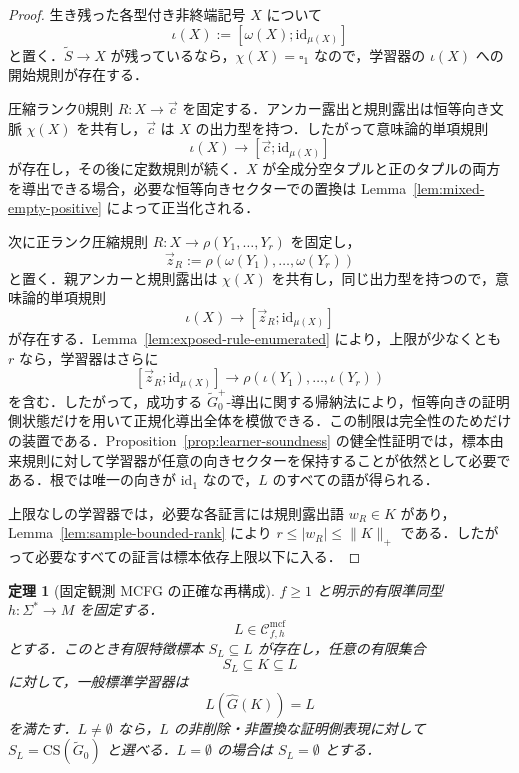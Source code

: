 \documentclass[11pt,a4paper]{ltjsarticle}
\numberwithin{equation}{section}
\theoremstyle{plain}
\newtheorem{theorem}{定理}[section]
\theoremstyle{definition}
\theoremstyle{remark}
\newcommand{\CS}{\mathrm{CS}}
\newcommand{\Cmcf}[2]{\mathcal{C}^{\mathrm{mcf}}_{#1,#2}}
\newcommand{\tuple}[1]{\vec{#1}}
\newcommand{\blank}{\square}
\begin{document}
\begin{proof}
生き残った各型付き非終端記号 \(X\) について
\[
  \iota(X):=[\omega(X);\mathrm{id}_{\mu(X)}]
\]
と置く．\(\widetilde S\to X\) が残っているなら，\(\chi(X)=\blank_1\) なので，学習器の \(\iota(X)\) への開始規則が存在する．

圧縮ランク0規則 \(R:X\to\tuple c\) を固定する．アンカー露出と規則露出は恒等向き文脈 \(\chi(X)\) を共有し，\(\tuple c\) は \(X\) の出力型を持つ．したがって意味論的単項規則
\[
  \iota(X)\to[\tuple c;\mathrm{id}_{\mu(X)}]
\]
が存在し，その後に定数規則が続く．\(X\) が全成分空タプルと正のタプルの両方を導出できる場合，必要な恒等向きセクターでの置換は Lemma~\ref{lem:mixed-empty-positive} によって正当化される．

次に正ランク圧縮規則
\(R:X\to\rho(Y_1,\ldots,Y_r)\)
を固定し，
\[
  \tuple z_R:=\rho(\omega(Y_1),\ldots,\omega(Y_r))
\]
と置く．親アンカーと規則露出は \(\chi(X)\) を共有し，同じ出力型を持つので，意味論的単項規則
\[
  \iota(X)\to[\tuple z_R;\mathrm{id}_{\mu(X)}]
\]
が存在する．Lemma~\ref{lem:exposed-rule-enumerated} により，上限が少なくとも \(r\) なら，学習器はさらに
\[
  [\tuple z_R;\mathrm{id}_{\mu(X)}]\to
  \rho(\iota(Y_1),\ldots,\iota(Y_r))
\]
を含む．したがって，成功する \(\widetilde G_0^+\)-導出に関する帰納法により，恒等向きの証明側状態だけを用いて正規化導出全体を模倣できる．この制限は完全性のためだけの装置である．Proposition~\ref{prop:learner-soundness} の健全性証明では，標本由来規則に対して学習器が任意の向きセクターを保持することが依然として必要である．根では唯一の向きが \(\mathrm{id}_1\) なので，\(L\) のすべての語が得られる．

上限なしの学習器では，必要な各証言には規則露出語 \(w_R\in K\) があり，Lemma~\ref{lem:sample-bounded-rank} により
\(r\le|w_R|\le\|K\|_+\)
である．したがって必要なすべての証言は標本依存上限以下に入る．
\end{proof}

\begin{theorem}[固定観測 MCFG の正確な再構成]
\label{thm:exact-reconstruction}
\(f\ge1\) と明示的有限準同型 \(h:\Sigma^*\to M\) を固定する．
\[
  L\in\Cmcf{f}{h}
\]
とする．このとき有限特徴標本 \(S_L\subseteq L\) が存在し，任意の有限集合
\[
  S_L\subseteq K\subseteq L
\]
に対して，一般標準学習器は
\[
  L(\widehat G(K))=L
\]
を満たす．\(L\ne\emptyset\) なら，\(L\) の非削除・非置換な証明側表現に対して
\(S_L=\CS(\widetilde G_0)\)
と選べる．\(L=\emptyset\) の場合は \(S_L=\emptyset\) とする．
\end{theorem}
\end{document}
